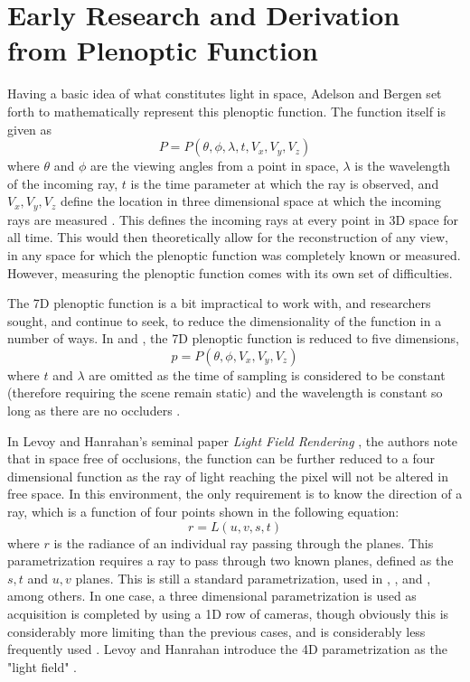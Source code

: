 \documentclass[12pt]{report}
\begin{document}
\section{Early Research and Derivation from Plenoptic Function}
Having a basic idea of what constitutes light in space, Adelson and Bergen set forth to mathematically represent this plenoptic function.
The function itself is given as 
\begin{equation}
P=P(\theta,\phi,\lambda,t,V_x, V_y,V_z)
\end{equation}
where $\theta$ and $\phi$ are the viewing angles from a point in space, $\lambda$ is the wavelength of the incoming ray, $t$ is the time parameter at which the ray is observed, and $V_x,V_y,V_z$ define the location in three dimensional space at which the incoming rays are measured \cite{Adelson91}. This defines the incoming rays at every point in 3D space for all time. This would then theoretically allow for the reconstruction of any view, in any space for which the plenoptic function was completely known or measured. However, measuring the plenoptic function comes with its own set of difficulties.

The 7D plenoptic function is a bit impractical to work with, and researchers sought, and continue to seek, to reduce the dimensionality of the function in a number of ways. In \cite{McMillan95} and \cite{Huang14}, the 7D plenoptic function is reduced to five dimensions,
\begin{equation}
p=P(\theta,\phi,V_x,V_y,V_z)
\end{equation}
where $t$ and $\lambda$ are omitted as the time of sampling is considered to be constant (therefore requiring the scene remain static) and the wavelength is constant so long as there are no occluders \cite{Levoy06a}. 

In Levoy and Hanrahan's seminal paper \emph{Light Field Rendering} \cite{Levoy96}, the authors note that in space free of occlusions, the function can be further reduced to a four dimensional function as the ray of light reaching the pixel will not be altered in free space. In this environment, the only requirement is to know the direction of a ray, which is a function of four points shown in the following equation:
\begin{equation}
r=L(u,v,s,t)
\end{equation}
where $r$ is the radiance of an individual ray passing through the planes. This parametrization requires a ray to pass through two known planes, defined as the $s,t$ and $u,v$ planes. This is  still a standard parametrization, used in \cite{Isaksen01}, \cite{Vaish06}, and \cite{Oberlin16}, among others. In one case, a three dimensional parametrization is used as acquisition is completed by using a 1D row of cameras, though obviously this is considerably more limiting than the previous cases, and is considerably less frequently used \cite{Kim13}. Levoy and Hanrahan introduce the 4D parametrization as the "light field" \cite{Levoy96}.
\end{document}
